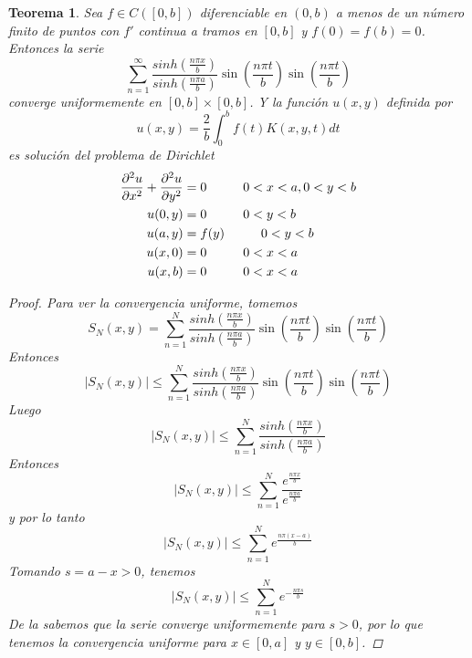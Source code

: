 \documentclass[11pt]{book}
\theoremstyle{plain}
\newtheorem{teo}[proposición]{Teorema}
\theoremstyle{definition}
\begin{document}
    \begin{teo}
        Sea $f\in C([0,b])$ diferenciable en $(0,b)$ a menos de un número finito de puntos con $f'$ continua a tramos en $[0,b]$ y $f(0) = f(b) = 0$. Entonces la serie
        \[
            \sum_{n=1}^{\infty} \frac{sinh\left(\frac{n\pi x}{b}\right)}{sinh\left(\frac{n\pi a}{b}\right)}\sin\left(\frac{n\pi t}{b}\right)\sin\left(\frac{n\pi t}{b}\right)
        \]
        converge uniformemente en $[0,b] \times [0,b]$. Y la función $u(x,y)$ definida por
        \[
            u(x,y) = \frac{2}{b}\int_{0}^{b} f(t)K(x,y,t)dt
        \]
        es solución del problema de Dirichlet
        \begin{align*}
            \frac{\partial^{2}u}{\partial x^{2}} + \frac{\partial^{2}u}{\partial y^{2}} &= 0 \hspace{10mm} 0<x<a, 0<y<b\\
            u(0,y) &= 0 \hspace{10mm} 0<y<b\\
            u(a,y) &= f(y) \hspace{10mm} 0<y<b\\
            u(x,0) &= 0 \hspace{10mm} 0<x<a\\
            u(x,b) &= 0 \hspace{10mm} 0<x<a
        \end{align*}
        \begin{proof}
            Para ver la convergencia uniforme, tomemos
            \[
                S_{N}(x,y) = \sum_{n=1}^{N} \frac{sinh\left(\frac{n\pi x}{b}\right)}{sinh\left(\frac{n\pi a}{b}\right)}\sin\left(\frac{n\pi t}{b}\right)\sin\left(\frac{n\pi t}{b}\right)
            \]
            Entonces
            \[
                |S_{N}(x,y)| \leq \sum_{n=1}^{N} \frac{sinh\left(\frac{n\pi x}{b}\right)}{sinh\left(\frac{n\pi a}{b}\right)}\sin\left(\frac{n\pi t}{b}\right)\sin\left(\frac{n\pi t}{b}\right)
            \]
            Luego
            \[
                |S_{N}(x,y)| \leq \sum_{n=1}^{N} \frac{sinh\left(\frac{n\pi x}{b}\right)}{sinh\left(\frac{n\pi a}{b}\right)}
            \]
            Entonces
            \[
                |S_{N}(x,y)| \leq \sum_{n=1}^{N} \frac{e^{\frac{n\pi x}{b}}}{e^{\frac{n\pi a}{b}}}
            \]
            y por lo tanto
            \[
                |S_{N}(x,y)| \leq \sum_{n=1}^{N} e^{\frac{n\pi (x-a)}{b}}
            \]
            Tomando $s = a -x > 0$, tenemos
            \[
                |S_{N}(x,y)| \leq \sum_{n=1}^{N} e^{-\frac{n\pi s}{b}}
            \]
            De la sabemos que la serie converge uniformemente para $s > 0$, por lo que tenemos la convergencia uniforme para $x \in [0,a]$ y $y \in [0,b]$.
            

\end{proof}
\end{teo}
\end{document}
